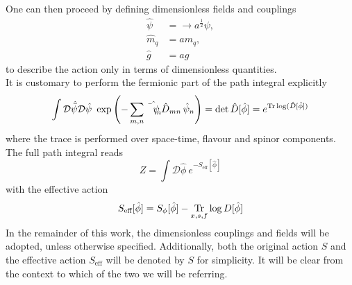 One can then proceed by defining dimensionless fields and couplings
\begin{equation*}
    \begin{aligned}
        \hat\psi &= \rightarrow a^{\frac{1}{2}} \psi, \\
        \hat m_q &= a m_q, \\
        \hat g &= a g
    \end{aligned}
    \label{eq:fermionic_theory_dimless_redefinitions}
\end{equation*}
to describe the action only in terms of dimensionless quantities. \\
It is customary to perform the fermionic part of the path integral explicitly
\begin{equation*}
    \int \mathcal{D}\hat{\bar\psi} \mathcal{D}\hat\psi \ \exp\left( - \sum_{m,n} \hat{\bar\psi_m} \, \hat D_{mn} \, \hat\psi_n \right) = \text{det} \, \hat D[\hat\phi] = e^{\operatorname{\text{Tr}} \log (\hat D[\hat\phi])}
\end{equation*}
where the trace is performed over space-time, flavour and spinor components. \\ 
The full path integral  reads 
\begin{equation*}
    Z = \int \mathcal{D}\hat\phi \ e^{-S_\text{eff}[\hat\phi]}
\end{equation*}
with the effective action
\begin{equation*}
    S_\text{eff}[\hat\phi] = S_{\phi}[\hat\phi] - \underset{x,s,f}{\operatorname{\text{Tr}}} \log D[\hat\phi]
\end{equation*}
In the remainder of this work, the dimensionless couplings and fields will be adopted, unless otherwise specified. Additionally, both the original action $S$ and the effective action $S_\text{eff}$ will be denoted by $S$ for simplicity. It will be clear from the context to which of the two we will be referring.
